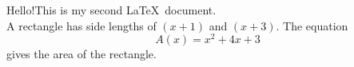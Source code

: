 \documentclass[11pt]{article}
\begin{document}
Hello!This is my second \LaTeX\ document.\\

A rectangle has side lengths of $(x+1)$ and $(x+3)$.
The equation $${A(x)=x^2+4x+3}$$ gives the area of the rectangle.
\end{document}

